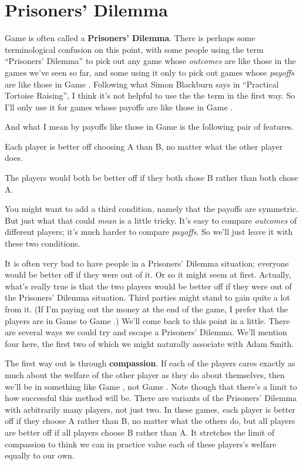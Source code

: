 \section{Prisoners' Dilemma}
Game  is often called a \textbf{Prisoners' Dilemma}. There is perhaps some terminological confusion on this point, with some people using the term ``Prisoners' Dilemma'' to pick out any game whose \textit{outcomes} are like those in the games we've seen so far, and some using it only to pick out games whose \textit{payoffs} are like those in Game . Following what Simon Blackburn says  in ``Practical Tortoise Raising'', I think it's not helpful to use the the term in the first way. So I'll only use it for games whose payoffs are like those in  Game .

And what I mean by payoffs like those in Game  is the following pair of features.

\begin{itemize*}
\item Each player is better off choosing A than B, no matter what the other player does.
\item The players would both be better off if they both chose B rather than both chose A.
\end{itemize*}

\noindent You might want to add a third condition, namely that the payoffs are symmetric. But just what that could \textit{mean} is a little tricky. It's easy to compare \textit{outcomes} of different players; it's much harder to compare \textit{payoffs}. So we'll just leave it with these two conditions.

It is often very bad to have people in a Prisoners' Dilemma situation; everyone would be better off if they were out of it. Or so it might seem at first. Actually, what's really true is that the two players would be better off if they were out of the Prisoners' Dilemma situation. Third parties might stand to gain quite a lot from it. (If I'm paying out the money at the end of the game, I prefer that the players are in Game  to Game .) We'll come back to this point in a little. There are several ways we could try and escape a Prisoners' Dilemma. We'll mention four here, the first two of which we might naturally associate with Adam Smith.

The first way out is through \textbf{compassion}. If each of the players cares exactly as much about the welfare of the other player as they do about themselves, then we'll be in something like Game , not Game . Note though that there's a limit to how successful this method will be. There are variants of the Prisoners' Dilemma with arbitrarily many  players, not just two. In these games, each player is better off if they choose A rather than B, no matter what the others do, but all players are better off if all players choose B rather than A. It stretches the limit of compassion to think we can in practice value each of these players's welfare equally to our own.

